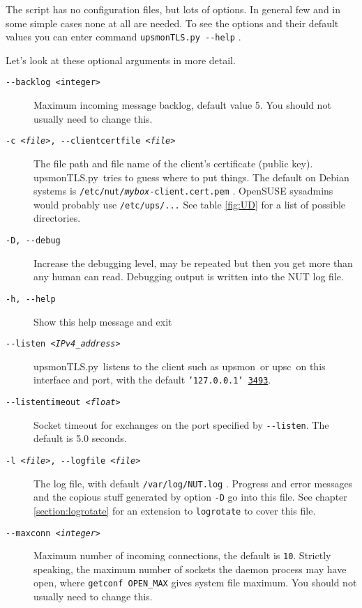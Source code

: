 \documentclass[12pt]{article}
\newcommand{\upsmon}{\mbox{\textcolor{MONCOLOUR}{upsmon}}}
\newcommand{\upsc}{\mbox{\textcolor{UPSMONCOLOUR}{upsc}}}
\newcommand{\upsmonTLS}{\mbox{\textcolor{UPSMONCOLOUR}{upsmonTLS.py}}}
\newcommand{\IANAnut}{\href{https://www.iana.org/assignments/service-names-port-numbers/service-names-port-numbers.xhtml?search=3493}%
                           {3493}}
\begin{document}
The script has no configuration files, but lots of options.  In
general few and in some simple cases none at all are needed.  To see
the options and their default values you can enter command
\texttt{upsmonTLS.py -\/-help} .

Let's look at these optional arguments in more detail.  

\begin{description}

\item[\texttt{-\/-backlog <integer>}] Maximum incoming message
  backlog, default value 5.  You should not usually need to change
  this.

\item[\texttt{-c \textit{<file>}, -\/-clientcertfile \textit{<file>}}]
  The file path and file name of the client's certificate (public
  key).  \upsmonTLS\ tries to guess where to put things.  The default
  on Debian systems is
  \texttt{/etc/{\allowbreak}nut/\textit{mybox}-client.cert.pem}
  .  OpenSUSE sysadmins would probably use
  \texttt{/etc/{\allowbreak}ups/...}  See table \ref{fig:UD} for a
  list of possible directories.

\item[\texttt{-D, -\/-debug}] Increase the debugging level, may be
  repeated but then you get more than any human can read.  Debugging
  output is written into the NUT log file.

\item[\texttt{-h, -\/-help}]  Show this help message and exit

\item[\texttt{-\/-listen \textit{<IPv4\_address>}}]
  \upsmonTLS\ listens to the client such as \upsmon\ or \upsc\ on this
  interface and port, with the default \texttt{'127.0.0.1' \IANAnut}.

\item[\texttt{-\/-listentimeout \textit{<float>}}] Socket timeout for
  exchanges on the port specified by \texttt{-\/-listen}.  The default
  is 5.0 seconds.

\item[\texttt{-l \textit{<file>}, -\/-logfile \textit{<file>}}] The
  log file, with default \texttt{/var/log/NUT.log} . Progress and
  error messages and the copious stuff generated by option \texttt{-D}
  go into this file.  See chapter \ref{section:logrotate} for an
  extension to \texttt{logrotate} to cover this file.

\item[\texttt{-\/-maxconn \textit{<integer>}}] Maximum number of
  incoming connections, the default is \texttt{10}.  Strictly
  speaking, the maximum number of sockets the daemon process may have
  open, where \texttt{getconf OPEN\_MAX} gives system file maximum.
  You should not usually need to change this.


\end{description}
\end{document}
